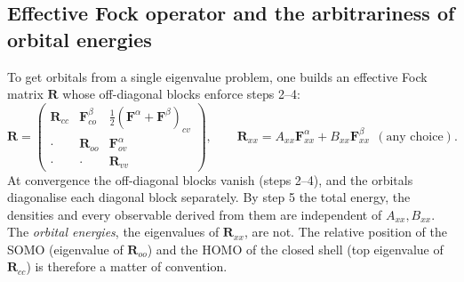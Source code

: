 \subsection{Effective Fock operator and the arbitrariness of orbital energies}
To get orbitals from a single eigenvalue problem, one builds an effective Fock matrix $\mathbf R$ whose
off-diagonal blocks enforce steps 2--4:
\begin{equation}
  \mathbf R=\begin{pmatrix}
  \mathbf R_{cc} & \mathbf F^\beta_{co} & \tfrac12(\mathbf F^\alpha+\mathbf F^\beta)_{cv}\\
  \cdot & \mathbf R_{oo} & \mathbf F^\alpha_{ov}\\
  \cdot & \cdot & \mathbf R_{vv}\end{pmatrix},\qquad
  \mathbf R_{xx}=A_{xx}\mathbf F^\alpha_{xx}+B_{xx}\mathbf F^\beta_{xx}\ \ (\text{any choice}).
\end{equation}
At convergence the off-diagonal blocks vanish (steps 2--4), and the orbitals diagonalise each diagonal
block separately. By step 5 the total energy, the densities and every observable derived from them are
independent of $A_{xx},B_{xx}$. The \emph{orbital energies}, the eigenvalues of $\mathbf R_{xx}$, are not. The
relative position of the SOMO (eigenvalue of $\mathbf R_{oo}$) and the HOMO of the closed shell (top
eigenvalue of $\mathbf R_{cc}$) is therefore a matter of convention.

